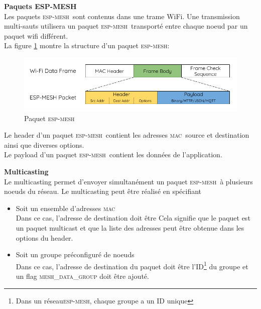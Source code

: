 \documentclass[a4paper, 12pt]{report}
\newcommand{\espmesh}{\textsc{esp-mesh}}
\newcommand{\mac}{\textsc{mac}}
\begin{document}
        \textbf{Paquets ESP-MESH}\\
            Les paquets \espmesh\ sont contenus dans une trame WiFi. Une transmission multi-sauts utilisera un paquet \espmesh\ transporté 
            entre chaque noeud par un paquet wifi différent.\\
            La figure \ref{fig_meshPacket} montre la structure d'un paquet \espmesh:\\

            \begin{figure}[h]
                \centering
                \includegraphics[scale=0.5]{images/mesh-packet.png}
                \caption{Paquet \espmesh\ \cite{esp-mesh_w}}
                \label{fig_meshPacket}
            \end{figure}
            Le header d'un paquet \espmesh\ contient les adresses \mac\ source et destination ainsi que diverses options.\\
            Le payload d'un paquet \espmesh\ contient les données de l'application.
        
        \vspace{0.5cm}
        \textbf{Multicasting}\\
            Le multicasting permet d'envoyer simultanément un paquet \espmesh\ à plusieurs noeuds du réseau. Le multicasting
            peut être réalisé en spécifiant
            \begin{itemize}
                \item Soit un ensemble d'adresses \mac\\
                    Dans ce cas, l'adresse de destination doit être
                    {\selectfont {}}
                    Cela signifie que le paquet est un paquet multicast et que la liste des adresses peut être obtenue dans les options du header.
                \item Soit un groupe préconfiguré de noeuds\\
                    Dans ce cas, l'adresse de destination du paquet doit être l'ID\footnote{Dans un réseau\espmesh, chaque groupe a un ID unique}
                    du groupe et un flag \textsc{mesh\_data\_group} doit être ajouté. %
            \end{itemize}
\end{document}
